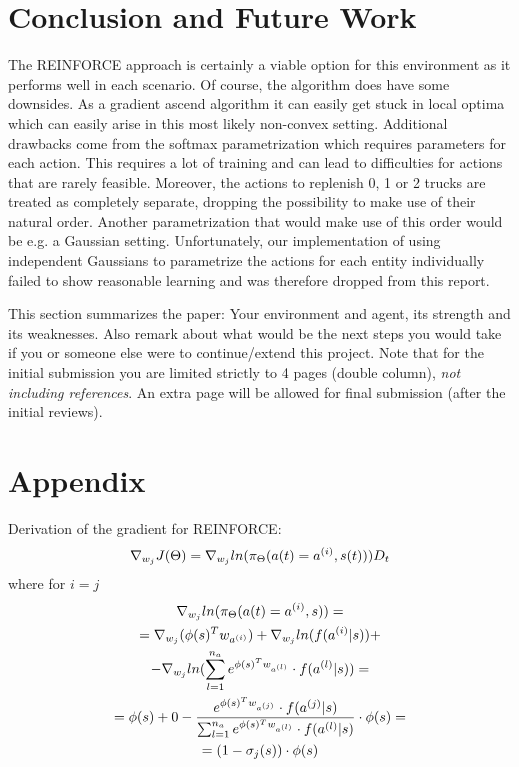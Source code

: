 \documentclass[journal, a4paper]{IEEEtran}
\theoremstyle{plain}
\theoremstyle{definition}
\begin{document}
\section{Conclusion and Future Work}
The REINFORCE approach is certainly a viable option for this environment as it performs well in each scenario. Of course, the algorithm does have some downsides. As a gradient ascend algorithm it can easily get stuck in local optima which can easily arise in this most likely non-convex setting. 
Additional drawbacks come from the softmax parametrization which 
requires parameters for each action. This requires a lot of training and can lead to difficulties for actions that are rarely feasible. Moreover, the actions to replenish 0, 1 or 2 trucks are treated as completely separate, dropping the possibility to make use of their natural order. Another parametrization that would make use of this order would be e.g. a Gaussian setting. 
Unfortunately, our implementation of using independent Gaussians to parametrize the actions for each entity individually failed to show reasonable learning and was therefore dropped from this report.


	This section summarizes the paper: Your environment and agent, its strength and its weaknesses. Also remark about what would be the next steps you would take if you or someone else were to continue/extend this project. 
	Note that for the initial submission you are limited strictly to 4 pages (double column), \emph{not including references}. An extra page will be allowed for final submission (after the initial reviews). 

\section{Appendix}
Derivation of the gradient for REINFORCE:
\begin{align}
	\nabla_{w_j}J(\Theta) = 
\nabla_{w_j} ln(\pi_\Theta(a(t) = a^{(i)},s(t)))D_t
\notag
\end{align}
where for $i = j$ 
\begin{gather}
\nabla_{w_j} ln(\pi_\Theta(a(t) = a^{(i)},s))= 
\notag
\\ 
=\nabla_{w_j} (\phi(s)^T w_{a^{(i)}}) + \nabla_{w_j} ln(f(a^{(i)}|s))
+
\notag
\\
 - 
\nabla_{w_j} ln(\sum_{l=1}^{n_a} e^{\phi(s)^T w_{a^{(l)}}}\cdot f(a^{(l)}|s))=
\notag
\\
=
\phi(s) + 0 - \frac{ e^{\phi(s)^T w_{a^{(j)}}} \cdot f(a^{(j)}|s)}{\sum_{l=1}^{n_a} e^{\phi(s)^T w_{a^{(l)}}}\cdot f(a^{(l)}|s)} \cdot \phi(s)
=
\notag
\\
=(1-\sigma_j(s))\cdot \phi(s)
\end{gather}
\end{document}
